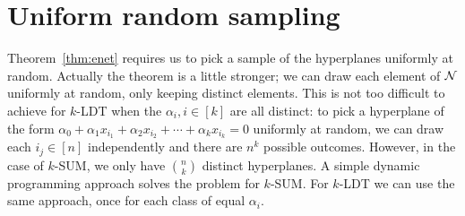 \section{Uniform random sampling}
\label{app:sampling}

Theorem~\ref{thm:enet} requires us to pick a sample of the hyperplanes
uniformly at random. Actually the theorem is a little stronger; we can draw
each element of $\mathcal{N}$ uniformly at random, only keeping distinct elements.
This is not too difficult to achieve for $k$-LDT when the $\alpha_i,i\in[k]$
are all distinct: to pick a hyperplane of the form $\alpha_0 + \alpha_1 x_{i_1}
+ \alpha_2 x_{i_2} + \cdots + \alpha_k x_{i_k} = 0$ uniformly at random, we can
draw each $i_j\in[n]$ independently and there are $n^k$ possible outcomes.
However, in the case of $k$-SUM, we only have $\binom{n}{k}$ distinct
hyperplanes. A simple dynamic programming approach solves the problem for
\(k\)-SUM. For \(k\)-LDT we can use the same approach, once for each class of equal
$\alpha_i$.

